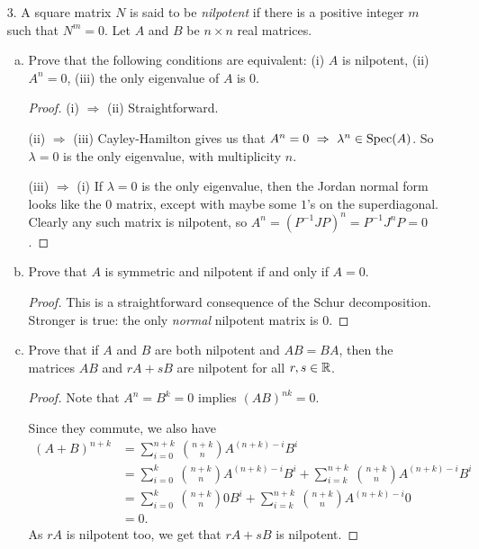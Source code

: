 \begin{itemize}
\begin{enumerate}[(a)]
    \item Does Part (d) still hold over $\bbq$? Fully justify your answer
    \begin{proof}
    It does. Since $\text{dim } V = 3$, $\rho_A(x) = \mu_A(x)$.
    \end{proof}
\end{enumerate}








\item[3.] A square matrix $N$ is said to be \textit{nilpotent} if there is a positive integer $m$ such that $N^m = 0$. Let $A$ and $B$ be $n \times n$ real matrices.
\begin{enumerate}[(a)]
    \item Prove that the following conditions are equivalent: (i) $A$ is nilpotent, (ii) $A^n = 0$, (iii) the only eigenvalue of $A$ is 0.
    \begin{proof}
    (i) $\Rightarrow$ (ii) Straightforward.
    
    \medskip 
    
    (ii) $\Rightarrow$ (iii) Cayley-Hamilton gives us that $A^n=0 \ \Rightarrow \ \lambda^n \in \Spec(A)$. So $\lambda=0$ is the only eigenvalue, with multiplicity $n$.
    
    \medskip 
    
    (iii) $\Rightarrow$ (i) If $\lambda=0$ is the only eigenvalue, then the Jordan normal form looks like the $0$ matrix, except with maybe some $1$'s on the superdiagonal. Clearly any such matrix is nilpotent, so $A^n = (P^{-1}JP)^n = P^{-1}J^nP = 0$.
    \end{proof}
    
    \item Prove that $A$ is symmetric and nilpotent if and only if $A = 0$.
    \begin{proof}
    This is a straightforward consequence of the Schur decomposition. Stronger is true: the only \textit{normal} nilpotent matrix is 0.
    \end{proof}
    
    \item Prove that if $A$ and $B$ are both nilpotent and $AB = BA$, then the matrices $AB$ and $rA + sB$ are nilpotent for all $r, s \in \mathbb{R}$.
    \begin{proof}
    Note that $A^n = B^k =0$ implies $(AB)^{nk} = 0$. 
    
    \medskip 
    Since they commute, we also have 
    \begin{align*}
        (A + B)^{n+k} &= \sum_{i=0}^{n+k} \ \binom{n+k}{n} A^{(n+k)-i} B^i \\
        &= \sum_{i=0}^{k} \ \binom{n+k}{n} A^{(n+k)-i} B^i + \sum_{i=k}^{n+k} \ \binom{n+k}{n} A^{(n+k)-i} B^i \\
        &= \sum_{i=0}^{k} \ \binom{n+k}{n} 0 B^i + \sum_{i=k}^{n+k} \ \binom{n+k}{n} A^{(n+k)-i} 0 \\
        &= 0.
    \end{align*}
    As $rA$ is nilpotent too, we get that $rA+sB$ is nilpotent. 
    \end{proof}
    

\end{enumerate}
\end{itemize}
